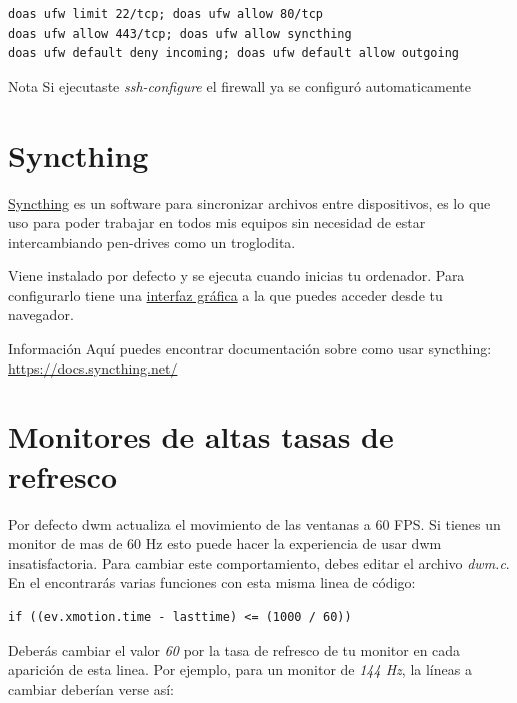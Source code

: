 \documentclass[11pt]{article}
\begin{document}
\begin{verbatim}
doas ufw limit 22/tcp; doas ufw allow 80/tcp
doas ufw allow 443/tcp; doas ufw allow syncthing
doas ufw default deny incoming; doas ufw default allow outgoing
\end{verbatim}

\begin{mybox}{Nota}
Si ejecutaste \textit{ssh-configure} el firewall ya se configuró automaticamente
\end{mybox}

\section{Syncthing}

\href{https://github.com/syncthing/syncthing}{Syncthing} es un software para sincronizar archivos entre dispositivos, es lo que uso para poder trabajar en todos mis equipos sin necesidad de estar intercambiando pen-drives como un troglodita.

Viene instalado por defecto y se ejecuta cuando inicias tu ordenador. Para configurarlo tiene una \href{http://localhost:8384/}{interfaz gráfica} a la que puedes acceder desde tu navegador.

\begin{mybox}{Información}
Aquí puedes encontrar documentación sobre como usar syncthing: \href{https://docs.syncthing.net/}{https://docs.syncthing.net/}
\end{mybox}

\section{Monitores de altas tasas de refresco}

Por defecto dwm actualiza el movimiento de las ventanas a 60 FPS. Si tienes un monitor de mas de 60 Hz esto puede hacer la experiencia de usar dwm insatisfactoria. Para cambiar este comportamiento, debes editar el archivo \textit{dwm.c}. En el encontrarás varias funciones con esta misma linea de código:

\begin{verbatim}
if ((ev.xmotion.time - lasttime) <= (1000 / 60))
\end{verbatim}

Deberás cambiar el valor \textit{60} por la tasa de refresco de tu monitor en cada aparición de esta linea. Por ejemplo, para un monitor de \textit{144 Hz}, la líneas a cambiar deberían verse así: 
\end{document}
